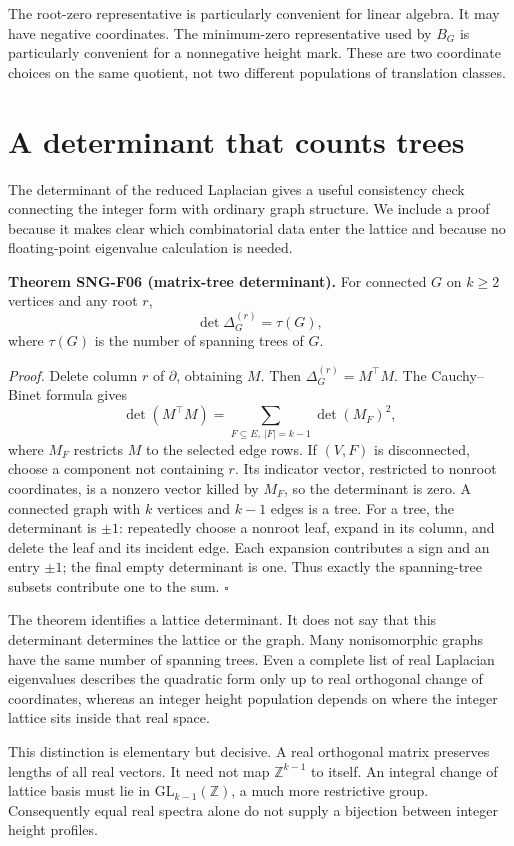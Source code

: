 \documentclass[
  11pt,
  a4paper,
]{report}
\begin{document}
The root-zero representative is particularly convenient for linear
algebra. It may have negative coordinates. The minimum-zero
representative used by \(B_G\) is particularly convenient for a
nonnegative height mark. These are two coordinate choices on the same
quotient, not two different populations of translation classes.

\hypertarget{a-determinant-that-counts-trees}{%
\section{A determinant that counts
trees}\label{a-determinant-that-counts-trees}}

The determinant of the reduced Laplacian gives a useful consistency
check connecting the integer form with ordinary graph structure. We
include a proof because it makes clear which combinatorial data enter
the lattice and because no floating-point eigenvalue calculation is
needed.

\textbf{Theorem SNG-F06 (matrix-tree determinant).} For connected \(G\)
on \(k\ge2\) vertices and any root \(r\), \[
\det\Delta_G^{(r)}=\tau(G),
\] where \(\tau(G)\) is the number of spanning trees of \(G\).

\emph{Proof.} Delete column \(r\) of \(\partial\), obtaining \(M\). Then
\(\Delta_G^{(r)}=M^\top M\). The Cauchy--Binet formula gives \[
\det(M^\top M)
=\sum_{F\subseteq E,\ |F|=k-1}\det(M_F)^2,
\] where \(M_F\) restricts \(M\) to the selected edge rows. If \((V,F)\)
is disconnected, choose a component not containing \(r\). Its indicator
vector, restricted to nonroot coordinates, is a nonzero vector killed by
\(M_F\), so the determinant is zero. A connected graph with \(k\)
vertices and \(k-1\) edges is a tree. For a tree, the determinant is
\(\pm1\): repeatedly choose a nonroot leaf, expand in its column, and
delete the leaf and its incident edge. Each expansion contributes a sign
and an entry \(\pm1\); the final empty determinant is one. Thus exactly
the spanning-tree subsets contribute one to the sum. \(\square\)

The theorem identifies a lattice determinant. It does not say that this
determinant determines the lattice or the graph. Many nonisomorphic
graphs have the same number of spanning trees. Even a complete list of
real Laplacian eigenvalues describes the quadratic form only up to real
orthogonal change of coordinates, whereas an integer height population
depends on where the integer lattice sits inside that real space.

This distinction is elementary but decisive. A real orthogonal matrix
preserves lengths of all real vectors. It need not map
\(\mathbb Z^{k-1}\) to itself. An integral change of lattice basis must
lie in \(\mathrm{GL}_{k-1}(\mathbb Z)\), a much more restrictive group.
Consequently equal real spectra alone do not supply a bijection between
integer height profiles.
\end{document}

